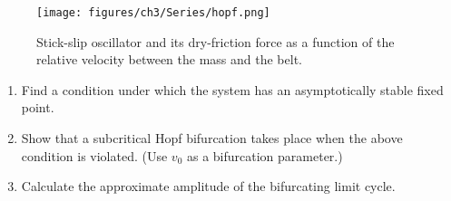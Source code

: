 \begin{exercise}
\begin{figure}[h!]
	\texttt{[image: figures/ch3/Series/hopf.png]}
\caption{Stick-slip oscillator and its dry-friction force as a function of the relative velocity between the mass and the belt.}
\label{fig:ex52fig2}
\end{figure}
\begin{enumerate}
\item Find a condition under which the system has an asymptotically stable fixed point.
\item Show that a subcritical Hopf bifurcation takes place when the above condition is violated. (Use $v_0$ as a bifurcation parameter.)
\item Calculate the approximate amplitude of the bifurcating limit cycle.
\end{enumerate}
\end{exercise}
